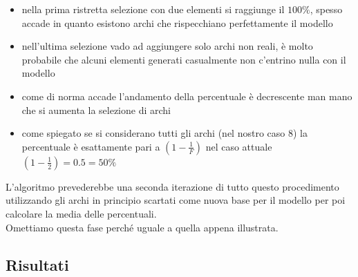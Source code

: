 \begin{itemize}
	\item nella prima ristretta selezione con due elementi si raggiunge il $100\%$, spesso accade in quanto esistono archi che rispecchiano perfettamente il modello
	\item nell'ultima selezione vado ad aggiungere solo archi non reali, è molto probabile che alcuni elementi generati casualmente non c'entrino nulla con il modello
	\item come di norma accade l'andamento della percentuale è decrescente man mano che si aumenta la selezione di archi
	\item come spiegato se si considerano tutti gli archi (nel nostro caso 8) la percentuale è esattamente pari a $\displaystyle \left( 1- \frac{1}{F} \right)$  nel caso attuale $\displaystyle \left( 1- \frac{1}{2} \right) = 0.5 = 50\%$
\end{itemize}
L'algoritmo prevederebbe una seconda iterazione di tutto questo procedimento utilizzando gli archi in principio scartati come nuova base per il modello per poi calcolare la media delle percentuali.\\ Omettiamo questa fase perché uguale a quella appena illustrata.
%
\subsection{Risultati}
%
%
%
%
